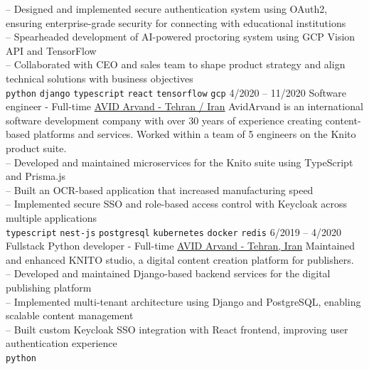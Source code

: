 \begin{entrylist}
{        -- Designed and implemented secure authentication system using OAuth2, ensuring enterprise-grade security for connecting with educational institutions \\
        -- Spearheaded development of AI-powered proctoring system using GCP Vision API and TensorFlow \\
        -- Collaborated with CEO and sales team to shape product strategy and align technical solutions with business objectives \\
        \texttt{python}\slashsep
        \texttt{django}\slashsep
        \texttt{typescript}\slashsep
        \texttt{react}\slashsep
        \texttt{tensorflow}\slashsep
        \texttt{gcp}\slashsep
    }
    \entry
    {4/2020 -- 11/2020}
    {Software engineer - Full-time}
    {
        \href{https://www.linkedin.com/company/avid-technology-development/}{AVID Arvand - Tehran / Iran}}
    {
        AvidArvand is an international software development company with over 30 years of experience creating content-based platforms and services. Worked within a team of 5 engineers on the Knito product suite. \\
        -- Developed and maintained microservices for the Knito suite using TypeScript and Prisma.js \\
        -- Built an OCR-based application that increased manufacturing speed \\
        -- Implemented secure SSO and role-based access control with Keycloak across multiple applications \\
        \texttt{typescript}\slashsep
        \texttt{nest-js}\slashsep
        \texttt{postgresql}\slashsep
        \texttt{kubernetes}\slashsep
        \texttt{docker}\slashsep
        \texttt{redis}\slashsep
    }
    \entry
    {6/2019 -- 4/2020}
    {Fullstack Python developer - Full-time}
    {
        \href{https://www.linkedin.com/company/avid-technology-development/}{AVID Arvand - Tehran, Iran}}
    {
        Maintained and enhanced KNITO studio, a digital content creation platform for publishers. \\
        -- Developed and maintained Django-based backend services for the digital publishing platform \\
        -- Implemented multi-tenant architecture using Django and PostgreSQL, enabling scalable content management \\
        -- Built custom Keycloak SSO integration with React frontend, improving user authentication experience \\
        \texttt{python}\slashsep
}
\end{entrylist}
